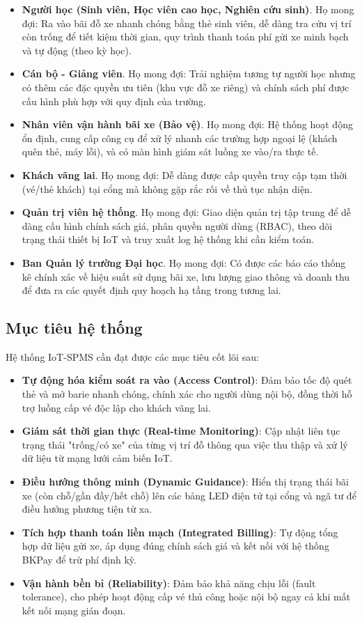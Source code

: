 \begin{itemize}
    \item \textbf{Người học (Sinh viên, Học viên cao học, Nghiên cứu sinh)}. Họ mong đợi: Ra vào bãi đỗ xe nhanh chóng bằng thẻ sinh viên, dễ dàng tra cứu vị trí còn trống để tiết kiệm thời gian, quy trình thanh toán phí gửi xe minh bạch và tự động (theo kỳ học).
    \item \textbf{Cán bộ - Giảng viên}. Họ mong đợi: Trải nghiệm tương tự người học nhưng có thêm các đặc quyền ưu tiên (khu vực đỗ xe riêng) và chính sách phí được cấu hình phù hợp với quy định của trường.
    \item \textbf{Nhân viên vận hành bãi xe (Bảo vệ)}. Họ mong đợi: Hệ thống hoạt động ổn định, cung cấp công cụ để xử lý nhanh các trường hợp ngoại lệ (khách quên thẻ, máy lỗi), và có màn hình giám sát luồng xe vào/ra thực tế.
    \item \textbf{Khách vãng lai}. Họ mong đợi: Dễ dàng được cấp quyền truy cập tạm thời (vé/thẻ khách) tại cổng mà không gặp rắc rối về thủ tục nhận diện.
    \item \textbf{Quản trị viên hệ thống}. Họ mong đợi: Giao diện quản trị tập trung để dễ dàng cấu hình chính sách giá, phân quyền người dùng (RBAC), theo dõi trạng thái thiết bị IoT và truy xuất log hệ thống khi cần kiểm toán.
    \item \textbf{Ban Quản lý trường Đại học}. Họ mong đợi: Có được các báo cáo thống kê chính xác về hiệu suất sử dụng bãi xe, lưu lượng giao thông và doanh thu để đưa ra các quyết định quy hoạch hạ tầng trong tương lai.
\end{itemize}

\subsection{Mục tiêu hệ thống}
Hệ thống IoT-SPMS cần đạt được các mục tiêu cốt lõi sau:
\begin{itemize}
    \item \textbf{Tự động hóa kiểm soát ra vào (Access Control)}: Đảm bảo tốc độ quét thẻ và mở barie nhanh chóng, chính xác cho người dùng nội bộ, đồng thời hỗ trợ luồng cấp vé độc lập cho khách vãng lai.
    \item \textbf{Giám sát thời gian thực (Real-time Monitoring)}: Cập nhật liên tục trạng thái "trống/có xe" của từng vị trí đỗ thông qua việc thu thập và xử lý dữ liệu từ mạng lưới cảm biến IoT.
    \item \textbf{Điều hướng thông minh (Dynamic Guidance)}: Hiển thị trạng thái bãi xe (còn chỗ/gần đầy/hết chỗ) lên các bảng LED điện tử tại cổng và ngã tư để điều hướng phương tiện từ xa.
    \item \textbf{Tích hợp thanh toán liền mạch (Integrated Billing)}: Tự động tổng hợp dữ liệu gửi xe, áp dụng đúng chính sách giá và kết nối với hệ thống BKPay để trừ phí định kỳ.
    \item \textbf{Vận hành bền bỉ (Reliability)}: Đảm bảo khả năng chịu lỗi (fault tolerance), cho phép hoạt động cấp vé thủ công hoặc nội bộ ngay cả khi mất kết nối mạng gián đoạn.
\end{itemize}

